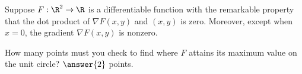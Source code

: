 \documentclass{ximera}
\author{Jim Fowler}
\begin{document}
\begin{exercise}
  Suppose $F : \R^2 \to \R$ is a differentiable function with the
  remarkable property that the dot product of $\nabla F (x,y)$ and
  $(x,y)$ is zero.  Moreover, except when $x = 0$, the gradient
  $\nabla F(x,y)$ is nonzero.

  How many points must you check to find where $F$ attains its maximum
  value on the unit circle?  $\answer{2}$ points.

\end{exercise}
\end{document}

